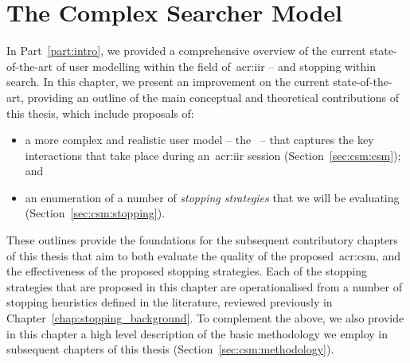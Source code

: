 
\chapter[The Complex Searcher Model]{The Complex Searcher Model}\label{chap:csm}
In Part~\ref{part:intro}, we provided a comprehensive overview of the current state-of-the-art of user modelling within the field of~\gls{acr:iir} -- and stopping within search. In this chapter, we present an improvement on the current state-of-the-art, providing an outline of the main conceptual and theoretical contributions of this thesis, which include proposals of:

\vspace*{-2mm}
\begin{itemize}
    \item[\blueboxbold{(i)}]{a more complex and realistic user model -- the~ -- that captures the key interactions that take place during an~\gls{acr:iir} session (Section~\ref{sec:csm:csm}); and}
    \item[\blueboxbold{(ii)}]{an enumeration of a number of \emph{stopping strategies} that we will be evaluating (Section~\ref{sec:csm:stopping}).}
\end{itemize}
\vspace*{-2mm}

These outlines provide the foundations for the subsequent contributory chapters of this thesis that aim to both evaluate the quality of the proposed~\gls{acr:csm}, and the effectiveness of the proposed stopping strategies. Each of the stopping strategies that are proposed in this chapter are operationalised from a number of stopping heuristics defined in the literature, reviewed previously in Chapter~\ref{chap:stopping_background}. To complement the above, we also provide in this chapter  a high level description of the basic methodology we employ in subsequent chapters of this thesis (Section~\ref{sec:csm:methodology}).

